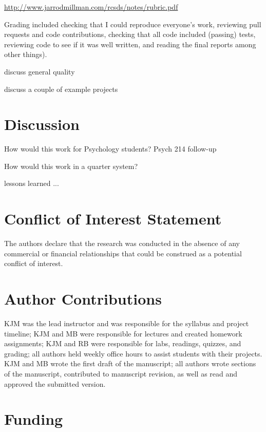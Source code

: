 \url{http://www.jarrodmillman.com/rcsds/notes/rubric.pdf}

Grading included checking that I could reproduce everyone's work, reviewing pull
requests and code contributions, checking that all code included
(passing) tests, reviewing code to see if it was well written, and
reading the final reports among other things). 

discuss general quality

discuss a couple of example projects
\citep{tom2007neural}

\section{Discussion}

How would this work for Psychology students?  Psych 214 follow-up

How would this work in a quarter system?

lessons learned ...


\section*{Conflict of Interest Statement}

The authors declare that the research was conducted in the absence of any commercial or financial relationships that could be construed as a potential conflict of interest.

\section*{Author Contributions}

KJM was the lead instructor and was responsible for the syllabus and project timeline;
KJM and MB were responsible for lectures and created homework assignments;
KJM and RB were responsible for labs, readings, quizzes, and grading;
all authors held weekly office hours to assist students with their projects.
KJM and MB wrote the first draft of the manuscript;
all authors wrote sections of the manuscript, contributed to manuscript revision, 
as well as read and approved the submitted version.

\section*{Funding}


